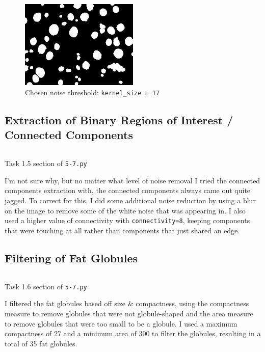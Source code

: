 \documentclass[a4paper]{article}
\newenvironment{code}{\captionsetup{type=listing}}{}
\begin{document}
\begin{figure}[H]
    \centering
    \includegraphics[width=0.5\textwidth]{../code/task1/output/kernel_size_17.jpg}
    \caption{Chosen noise threshold: \texttt{kernel_size = 17}}
\end{figure}

\subsection{Extraction of Binary Regions of Interest / Connected Components}
\begin{code}
\inputminted[firstline=1, lastline=9, linenos, breaklines, frame=single]{python}{../code/task1/5-7.py}
\caption{Task 1.5 section of \texttt{5-7.py}}
\end{code}

I'm not sure why, but no matter what level of noise removal I tried the connected components extraction with, the connected components always came out quite jagged.
To correct for this, I did some additional noise reduction by using a blur on the image to remove some of the white noise that was appearing in.
I also used a higher value of connectivity with \texttt{connectivity=8}, keeping components that were touching at all rather than components that just shared an edge.

\subsection{Filtering of Fat Globules}
\begin{code}
\inputminted[firstline=11, lastline=29, linenos, breaklines, frame=single]{python}{../code/task1/5-7.py}
\caption{Task 1.6 section of \texttt{5-7.py}}
\end{code}

I filtered the fat globules based off size \& compactness, using the compactness measure to remove globules that were not globule-shaped and the area measure to remove globules that were too small to be a globule.
I used a maximum compactness of 27 and a minimum area of 300 to filter the globules, resulting in a total of 35 fat globules.
\end{document}
